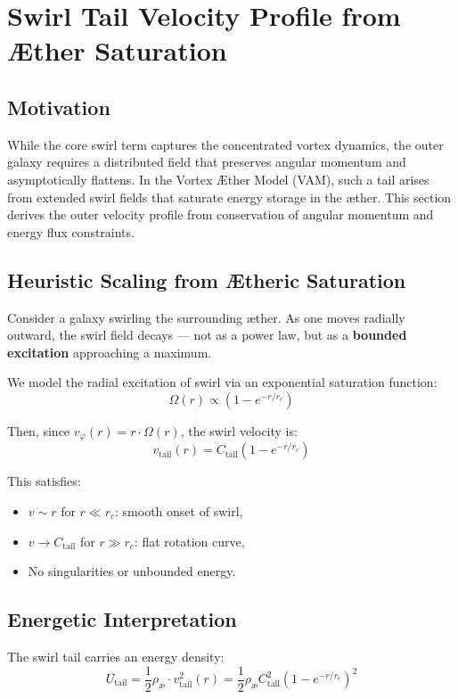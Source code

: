 \documentclass[12pt]{article}
\begin{document}
\section{Swirl Tail Velocity Profile from Æther Saturation}
\label{appendix:swirl-tail}

\subsection{Motivation}

While the core swirl term captures the concentrated vortex dynamics, the outer galaxy requires a distributed field that preserves angular momentum and asymptotically flattens. In the Vortex \AE{}ther Model (VAM), such a tail arises from extended swirl fields that saturate energy storage in the æther. This section derives the outer velocity profile from conservation of angular momentum and energy flux constraints.

\subsection{Heuristic Scaling from Ætheric Saturation}

Consider a galaxy swirling the surrounding æther. As one moves radially outward, the swirl field decays — not as a power law, but as a \textbf{bounded excitation} approaching a maximum.

We model the radial excitation of swirl via an exponential saturation function:
\[
\Omega(r) \propto \left(1 - e^{-r/r_c} \right)
\]

Then, since \( v_\varphi(r) = r \cdot \Omega(r) \), the swirl velocity is:
\[
v_\text{tail}(r) = C_{\text{tail}} \left(1 - e^{-r/r_c} \right)
\]

This satisfies:
\begin{itemize}
    \item \( v \sim r \) for \( r \ll r_c \): smooth onset of swirl,
    \item \( v \to C_{\text{tail}} \) for \( r \gg r_c \): flat rotation curve,
    \item No singularities or unbounded energy.
\end{itemize}

\subsection{Energetic Interpretation}

The swirl tail carries an energy density:
\[
U_{\text{tail}} = \frac{1}{2} \rho_{\text{\ae}} \cdot v_\text{tail}^2(r)
= \frac{1}{2} \rho_{\text{\ae}} C_{\text{tail}}^2 \left(1 - e^{-r/r_c} \right)^2
\]
\end{document}
